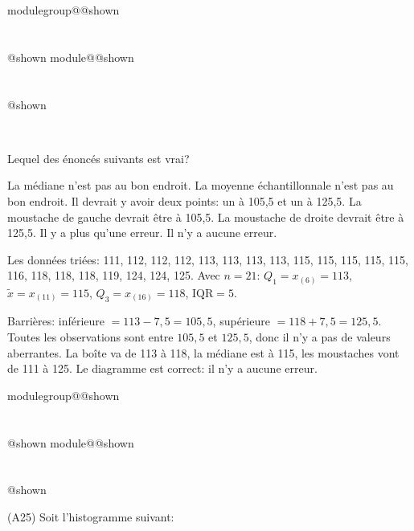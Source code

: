 \documentclass{Evaluation}
\makeatletter
\newcommand{\currentmodulekey}{}
\newcommand{\currentmoduletitle}{}
\newcommand{\currentgroupkey}{}
\newcommand{\currentgrouptitle}{}
\newcommand{\showmoduleifneeded}{%
  \ifx\currentgroupkey\empty\else
    \expandafter\ifx\csname modulegroup@\currentgroupkey @shown\endcsname\relax
      \section*{\currentgrouptitle}%
      \expandafter\gdef\csname modulegroup@\currentgroupkey @shown\endcsname{1}%
    \fi
  \fi
  \expandafter\ifx\csname module@\currentmodulekey @shown\endcsname\relax
    \section*{\currentmoduletitle}%
    \expandafter\gdef\csname module@\currentmodulekey @shown\endcsname{1}%
  \fi
}
\newenvironment{A24}{\showmoduleifneeded}{}
\newenvironment{A25}{\showmoduleifneeded}{}
\makeatother
\begin{document}
\begin{questions}
\begin{A24}
\begin{center}
\\
	\end{center}

Lequel des énoncés suivants est vrai?

  \begin{checkboxes}
\choice La médiane n'est pas au bon endroit.  %
\choice La moyenne échantillonnale n'est pas au bon endroit. %
\choice Il devrait y avoir deux points: un à 105,5 et un à 125,5.
\choice La moustache de gauche devrait être à  105,5. 
\choice La moustache de droite devrait être à 125,5.
\choice Il y a plus qu'une erreur.
\correctchoice Il n'y a aucune erreur.
\end{checkboxes}

\begin{solution}
Les données triées: 111, 112, 112, 112, 113, 113, 113, 113, 115, 115, 115, 115, 115, 116, 118, 118, 118, 119, 124, 124, 125. Avec $n=21$: $Q_1=x_{(6)}=113$, $\tilde{x}=x_{(11)}=115$, $Q_3=x_{(16)}=118$, $\text{IQR}=5$.

Barrières: inférieure $= 113-7{,}5=105{,}5$, supérieure $= 118+7{,}5=125{,}5$. Toutes les observations sont entre $105{,}5$ et $125{,}5$, donc il n'y a pas de valeurs aberrantes. La boîte va de 113 à 118, la médiane est à 115, les moustaches vont de 111 à 125. Le diagramme est correct: il n'y a aucune erreur.
\end{solution}
\end{A24}

\begin{A25}
\question (A25) Soit l'histogramme suivant:

\begin{center}
    
\end{center}
\end{A25}
\end{questions}
\end{document}

